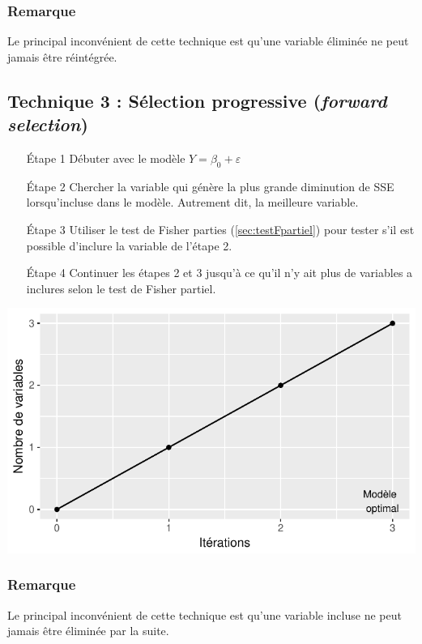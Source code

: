 \documentclass[11pt,french]{report}
\begin{document}
\subsubsection*{Remarque}
Le principal inconvénient de cette technique est qu'une variable éliminée ne peut jamais être réintégrée. 

\subsection{Technique 3 : Sélection progressive (\emph{forward selection})}
\label{tech3}

\begin{itemize}
\item [Étape 1] Débuter avec le modèle $Y = \beta_0 + \varepsilon$

\item [Étape 2] Chercher la variable qui génère la plus grande diminution de SSE lorsqu'incluse dans le modèle. Autrement dit, la meilleure variable.

\item [Étape 3] Utiliser le test de Fisher parties (\ref{sec:testFpartiel}) pour tester s'il est possible d'inclure la variable de l'étape 2.

\item [Étape 4] Continuer les étapes 2 et 3 jusqu'à ce qu'il n'y ait plus de variables a inclures selon le test de Fisher partiel.
\end{itemize}
\bigskip

\includegraphics{notes_de_cours-026}

\subsubsection*{Remarque}
Le principal inconvénient de cette technique est qu'une variable incluse ne peut jamais être éliminée par la suite. 
\end{document}
